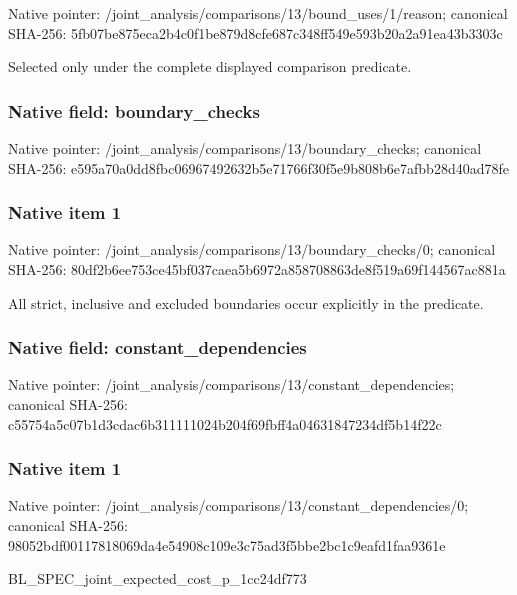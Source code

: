 \documentclass[10pt,a4paper]{article}
\begin{document}
Native pointer: /joint\_analysis/comparis\allowbreak{}ons/13/bound\_uses/1/reas\allowbreak{}on; canonical SHA-256: 5fb07be875eca2b4c0f1be87\allowbreak{}9d8cfe687c348ff549e593b2\allowbreak{}0a2a91ea43b3303c


Selected only under the complete displayed comparison predicate.


\subsubsection{Native field: boundary\_checks}


Native pointer: /joint\_analysis/comparis\allowbreak{}ons/13/boundary\_checks; canonical SHA-256: e595a70a0dd8fbc069674926\allowbreak{}32b5e71766f30f5e9b808b6e\allowbreak{}7afbb28d40ad78fe



\subsubsection{Native item 1}


Native pointer: /joint\_analysis/comparis\allowbreak{}ons/13/boundary\_checks/0; canonical SHA-256: 80df2b6ee753ce45bf037cae\allowbreak{}a5b6972a858708863de8f519\allowbreak{}a69f144567ac881a


All strict, inclusive and excluded boundaries occur explicitly in the predicate.


\subsubsection{Native field: constant\_dependencies}


Native pointer: /joint\_analysis/comparis\allowbreak{}ons/13/constant\_dependen\allowbreak{}cies; canonical SHA-256: c55754a5c07b1d3cdac6b311\allowbreak{}111024b204f69fbff4a04631\allowbreak{}847234df5b14f22c



\subsubsection{Native item 1}


Native pointer: /joint\_analysis/comparis\allowbreak{}ons/13/constant\_dependen\allowbreak{}cies/0; canonical SHA-256: 98052bdf00117818069da4e5\allowbreak{}4908c109e3c75ad3f5bbe2bc\allowbreak{}1c9eafd1faa9361e


BL\_SPEC\_joint\_expected\_c\allowbreak{}ost\_p\_1cc24df773
\end{document}
